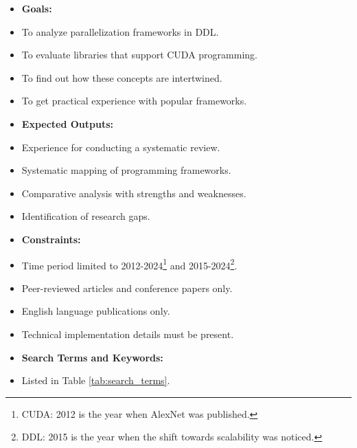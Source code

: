 \begin{itemize}
	\item \textbf{Goals:}
	\item To analyze parallelization frameworks in DDL.
	\item To evaluate libraries that support CUDA programming.
	\item To find out how these concepts are intertwined.
	\item To get practical experience with popular frameworks. \\
	\item \textbf{Expected Outputs:}
	\item Experience for conducting a systematic review.
	\item Systematic mapping of programming frameworks.
	\item Comparative analysis with strengths and weaknesses.
	\item Identification of research gaps. \\
	\item \textbf{Constraints:}
	\item Time period limited to 2012-2024\footnote{CUDA: 2012 is the year when AlexNet was published.} and
	      2015-2024\footnote{DDL: 2015 is the year when the shift towards scalability was noticed.}.
	\item Peer-reviewed articles and conference papers only.
	\item English language publications only.
	\item Technical implementation details must be present. \\
	\item \textbf{Search Terms and Keywords:}
	\item Listed in Table \ref{tab:search_terms}.
\end{itemize}

